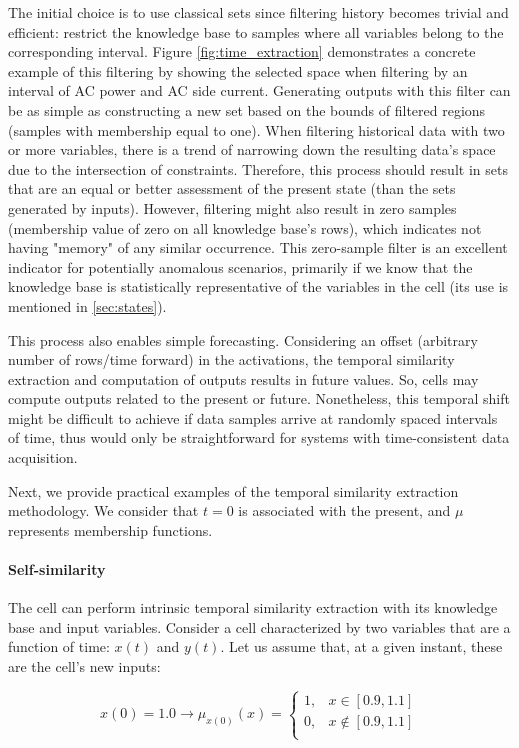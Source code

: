 The initial choice is to use classical sets since filtering history becomes trivial and efficient: restrict the knowledge base to samples where all variables belong to the corresponding interval. Figure \ref{fig:time_extraction} demonstrates a concrete example of this filtering by showing the selected space when filtering by an interval of AC power and AC side current. Generating outputs with this filter can be as simple as constructing a new set based on the bounds of filtered regions (samples with membership equal to one). When filtering historical data with two or more variables, there is a trend of narrowing down the resulting data's space due to the intersection of constraints. Therefore, this process should result in sets that are an equal or better assessment of the present state (than the sets generated by inputs). However, filtering might also result in zero samples (membership value of zero on all knowledge base's rows), which indicates not having "memory" of any similar occurrence. This zero-sample filter is an excellent indicator for potentially anomalous scenarios, primarily if we know that the knowledge base is statistically representative of the variables in the cell (its use is mentioned in \ref{sec:states}).


This process also enables simple forecasting. Considering an offset (arbitrary number of rows/time forward) in the activations, the temporal similarity extraction and computation of outputs results in future values. So, cells may compute outputs related to the present or future. Nonetheless, this temporal shift might be difficult to achieve if data samples arrive at randomly spaced intervals of time, thus would only be straightforward for systems with time-consistent data acquisition.

Next, we provide practical examples of the temporal similarity extraction methodology. We consider that $t=0$ is associated with the present, and $\mu$ represents membership functions.

\paragraph{Self-similarity}

The cell can perform intrinsic temporal similarity extraction with its knowledge base and input variables. Consider a cell characterized by two variables that are a function of time: $x(t)$ and $y(t)$.
Let us assume that, at a given instant, these are the cell's new inputs:

\begin{equation}
    x(0) = 1.0 \rightarrow \mu_{x(0)}(x) =
    \begin{cases}
        1, & x \in [0.9, 1.1]    \\
        0, & x \notin [0.9, 1.1] \\
    \end{cases}
\end{equation}

